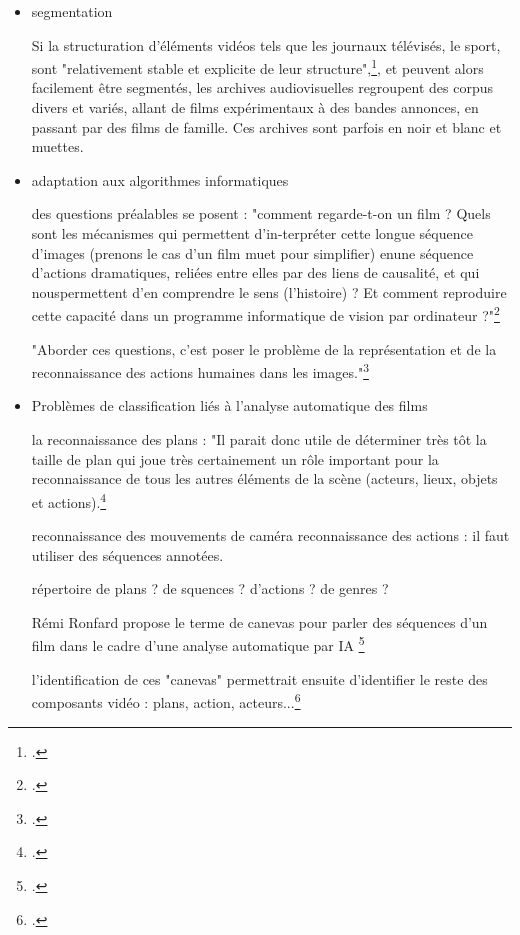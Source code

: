 \begin{itemize}
\item segmentation

Si la structuration d'éléments vidéos tels que les journaux télévisés, le sport, sont "relativement stable et explicite de leur structure",\footcite{carrive2014}, et peuvent alors facilement être segmentés, les archives audiovisuelles regroupent des corpus divers et variés, allant de films expérimentaux à des bandes annonces, en passant par des films de famille. Ces archives sont parfois en noir et blanc et muettes. 

\item adaptation aux algorithmes informatiques

des questions préalables se posent : 
"comment regarde-t-on un ﬁlm ? Quels sont les mécanismes qui permettent d’in-terpréter cette longue séquence d’images (prenons le cas d’un ﬁlm muet pour simpliﬁer) enune séquence d’actions dramatiques, reliées entre elles par des liens de causalité, et qui nouspermettent d’en comprendre le sens (l’histoire) ? Et comment reproduire cette capacité dans un programme informatique de vision par ordinateur ?"\footcite{zotero-item-644}

"Aborder ces questions, c’est poser le problème de la représentation et de la reconnaissance des actions humaines dans les images."\footcite{zotero-item-644}

\item Problèmes de classification liés à l'analyse automatique des films

la reconnaissance des plans : "Il parait donc
utile de déterminer très tôt la taille de plan qui joue très certainement un rôle important pour la
reconnaissance de tous les autres éléments de la scène (acteurs, lieux, objets et actions).\footcite{zotero-item-644}

reconnaissance des mouvements de caméra
reconnaissance des actions : il faut utiliser des séquences annotées.

répertoire de plans ? de squences ? d'actions ? de genres ?

Rémi Ronfard propose le terme de canevas pour parler des séquences d'un film dans le cadre d'une analyse automatique par IA \footcite{zotero-item-644}

l'identification de ces "canevas" permettrait ensuite d'identifier le reste des composants vidéo : plans, action, acteurs...\footcite{zotero-item-644}

\end{itemize}